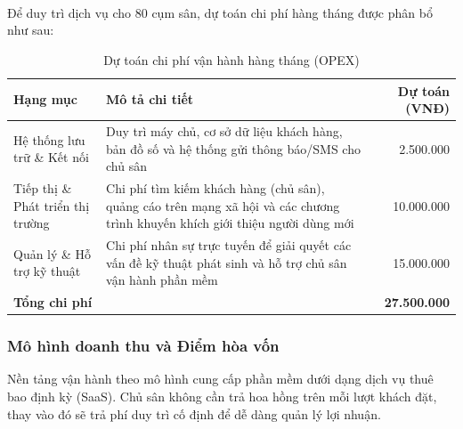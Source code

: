 \\ \\ \\
Để duy trì dịch vụ cho 80 cụm sân, dự toán chi phí hàng tháng được phân bổ như sau:
\begin{table}[H]
    \centering
    \begin{tabularx}{\textwidth}{@{}l X r@{}}
        \toprule
        \textbf{Hạng mục} & \textbf{Mô tả chi tiết} & \textbf{Dự toán (VNĐ)} \\
        \midrule
        Hệ thống lưu trữ \& Kết nối & Duy trì máy chủ, cơ sở dữ liệu khách hàng, bản đồ số và hệ thống gửi thông báo/SMS cho chủ sân & 2.500.000 \\
        \addlinespace
        Tiếp thị \& Phát triển thị trường & Chi phí tìm kiếm khách hàng (chủ sân), quảng cáo trên mạng xã hội và các chương trình khuyến khích giới thiệu người dùng mới & 10.000.000 \\
        \addlinespace
        Quản lý \& Hỗ trợ kỹ thuật & Chi phí nhân sự trực tuyến để giải quyết các vấn đề kỹ thuật phát sinh và hỗ trợ chủ sân vận hành phần mềm & 15.000.000 \\
        \midrule
        \textbf{Tổng chi phí} & & \textbf{27.500.000} \\
        \bottomrule
    \end{tabularx}
    \caption{Dự toán chi phí vận hành hàng tháng (OPEX)}
    \label{tab:opex_estimate}
    \small
\end{table}

\subsubsection{Mô hình doanh thu và Điểm hòa vốn}
Nền tảng vận hành theo mô hình cung cấp phần mềm dưới dạng dịch vụ thuê bao định kỳ (SaaS). Chủ sân không cần trả hoa hồng trên mỗi lượt khách đặt, thay vào đó sẽ trả phí duy trì cố định để dễ dàng quản lý lợi nhuận. \\ 

